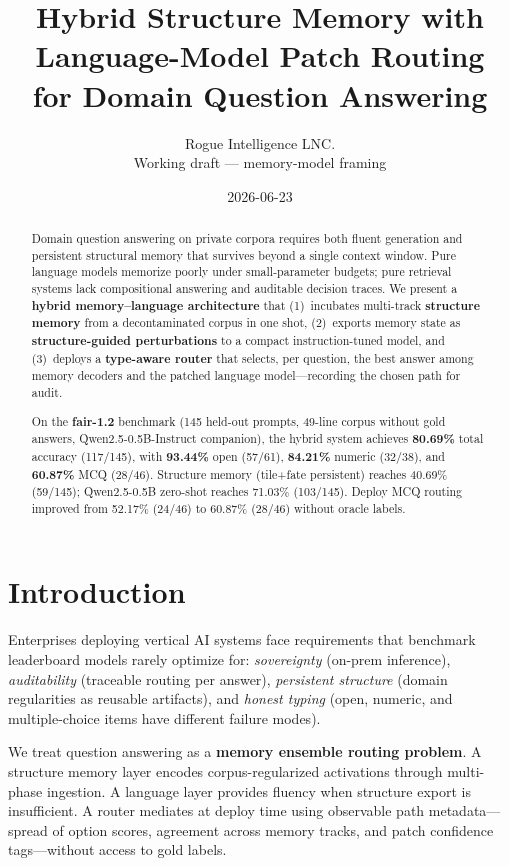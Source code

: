 \documentclass[11pt,a4paper]{article}
\title{Hybrid Structure Memory with Language-Model Patch Routing\\for Domain Question Answering}
\author{Rogue Intelligence LNC.\\Working draft --- memory-model framing}
\date{2026-06-23}
\begin{document}
\maketitle

\begin{abstract}
Domain question answering on private corpora requires both fluent generation and persistent structural memory that survives beyond a single context window. Pure language models memorize poorly under small-parameter budgets; pure retrieval systems lack compositional answering and auditable decision traces. We present a \textbf{hybrid memory--language architecture} that (1)~incubates multi-track \textbf{structure memory} from a decontaminated corpus in one shot, (2)~exports memory state as \textbf{structure-guided perturbations} to a compact instruction-tuned model, and (3)~deploys a \textbf{type-aware router} that selects, per question, the best answer among memory decoders and the patched language model---recording the chosen path for audit.

On the \textbf{fair-1.2} benchmark (145 held-out prompts, 49-line corpus without gold answers, Qwen2.5-0.5B-Instruct companion), the hybrid system achieves \textbf{80.69\%} total accuracy (117/145), with \textbf{93.44\%} open (57/61), \textbf{84.21\%} numeric (32/38), and \textbf{60.87\%} MCQ (28/46). Structure memory (tile+fate persistent) reaches 40.69\% (59/145); Qwen2.5-0.5B zero-shot reaches 71.03\% (103/145). Deploy MCQ routing improved from 52.17\% (24/46) to 60.87\% (28/46) without oracle labels.
\end{abstract}

\section{Introduction}
Enterprises deploying vertical AI systems face requirements that benchmark leaderboard models rarely optimize for: \emph{sovereignty} (on-prem inference), \emph{auditability} (traceable routing per answer), \emph{persistent structure} (domain regularities as reusable artifacts), and \emph{honest typing} (open, numeric, and multiple-choice items have different failure modes).

We treat question answering as a \textbf{memory ensemble routing problem}. A structure memory layer encodes corpus-regularized activations through multi-phase ingestion. A language layer provides fluency when structure export is insufficient. A router mediates at deploy time using observable path metadata---spread of option scores, agreement across memory tracks, and patch confidence tags---without access to gold labels.
\end{document}
